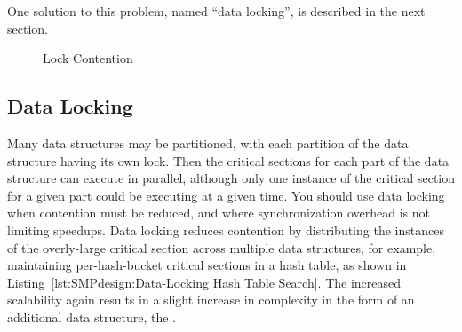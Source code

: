 

One solution to this problem, named ``data locking'', is described
in the next section.

\begin{figure}[tbh]
\centering
{}
\caption{Lock Contention}
\end{figure}

\subsection{Data Locking}
\label{sec:SMPdesign:Data Locking}

Many data structures may be partitioned,
with each partition of the data structure having its own lock.
Then the critical sections for each part of the data structure
can execute in parallel,
although only one instance of the critical section for a given
part could be executing at a given time.
You should use data locking when contention must
be reduced, and where synchronization overhead is not
limiting speedups.
Data locking reduces contention by distributing the instances
of the overly-large critical section across multiple data structures,
for example, maintaining per-hash-bucket critical sections in a
hash table, as shown in
Listing~\ref{lst:SMPdesign:Data-Locking Hash Table Search}.
The increased scalability again results in a slight increase in complexity
in the form of an additional data structure, the .


